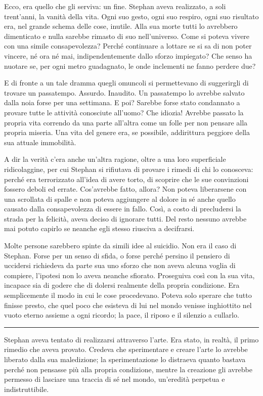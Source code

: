 \documentclass[a4paper,11pt,oneside]{memoir}
\begin{document}
Ecco, era quello che gli serviva: un fine. Stephan aveva realizzato, a soli
trent'anni, la vanità della vita. Ogni suo gesto, ogni suo respiro, ogni suo
risultato era, nel grande schema delle cose, inutile. Alla sua morte tutti lo
avrebbero dimenticato e nulla sarebbe rimasto di suo nell'universo. Come si
poteva vivere con una simile consapevolezza? Perché continuare a lottare se si
sa di non poter vincere, né ora né mai, indipendentemente dallo sforzo
impiegato? Che senso ha nuotare se, per ogni metro guadagnato, le onde
inclementi ne fanno perdere due?

E di fronte a un tale dramma quegli omuncoli si permettevano di suggerirgli di
trovare un passatempo. Assurdo. Inaudito. Un passatempo lo avrebbe salvato dalla
noia forse per una settimana. E poi? Sarebbe forse stato condannato a provare
tutte le attività conosciute all'uomo? Che idiozia! Avrebbe passato la propria
vita correndo da una parte all'altra come un folle per non pensare alla propria
miseria. Una vita del genere era, se possibile, addirittura peggiore della sua
attuale immobilità.

A dir la verità c'era anche un'altra ragione, oltre a una loro superficiale
ridicolaggine, per cui Stephan si rifiutava di provare i rimedi di chi lo
conosceva: perché era terrorizzato all'idea di avere torto, di scoprire che le
sue convinzioni fossero deboli ed errate. Cos'avrebbe fatto, allora? Non poteva
liberarsene con una scrollata di spalle e non poteva aggiungere al dolore in sé
anche quello causato dalla consapevolezza di essere in fallo. Così, a costo di
precludersi la strada per la felicità, aveva deciso di ignorare tutti. Del resto
nessuno avrebbe mai potuto capirlo se neanche egli stesso riusciva a decifrarsi.

Molte persone sarebbero spinte da simili idee al suicidio. Non era il caso di
Stephan. Forse per un senso di sfida, o forse perché persino il pensiero di
uccidersi richiedeva da parte sua uno sforzo che non aveva alcuna voglia di
compiere, l'ipotesi non lo aveva neanche sfiorato. Proseguiva così con la sua
vita, incapace sia di godere che di dolersi realmente della propria condizione.
Era semplicemente il modo in cui le cose procedevano. Poteva solo sperare che
tutto finisse presto, che quel poco che esisteva di lui nel mondo venisse
inghiottito nel vuoto eterno assieme a ogni ricordo; la pace, il riposo e il
silenzio a cullarlo.

\plainbreak{1}

Stephan aveva tentato di realizzarsi attraverso l'arte. Era stato, in realtà, il
primo rimedio che aveva provato. Credeva che sperimentare e creare l'arte lo
avrebbe liberato dalla sua maledizione; la sperimentazione lo distraeva quanto
bastava perché non pensasse più alla propria condizione, mentre la creazione gli
avrebbe permesso di lasciare una traccia di sé nel mondo, un'eredità perpetua e
indistruttibile.
\end{document}
